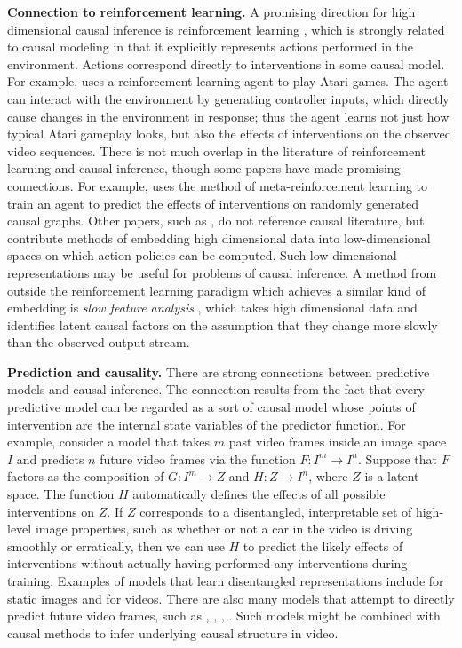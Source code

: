 \documentclass[letterpaper, twocolumn]{article} %
\begin{document}
\noindent \textbf{Connection to reinforcement learning.} A promising direction for high dimensional causal inference is reinforcement learning \cite{sutton2018reinforcement}, which is strongly related to causal modeling in that it explicitly represents actions performed in the environment. Actions correspond directly to interventions in some causal model. For example, \cite{oh2015action} uses a reinforcement learning agent to play Atari games. The agent can interact with the environment by generating controller inputs, which directly cause changes in the environment in response; thus the agent learns not just how typical Atari gameplay looks, but also the effects of interventions on the observed video sequences. There is not much overlap in the literature of reinforcement learning and causal inference, though some papers have made promising connections. For example, \cite{dasgupta2019causal} uses the method of meta-reinforcement learning to train an agent to predict the effects of interventions on randomly generated causal graphs. Other papers, such as \cite{lange2012autonomous}, do not reference causal literature, but contribute methods of embedding high dimensional data into low-dimensional spaces on which action policies can be computed. Such low dimensional representations may be useful for problems of causal inference. A method from outside the reinforcement learning paradigm which achieves a similar kind of embedding is \emph{slow feature analysis} \cite{kompella2011incremental}, which takes high dimensional data and identifies latent causal factors on the assumption that they change more slowly than the observed output stream.

\noindent \textbf{Prediction and causality.} There are strong connections between predictive models and causal inference. The connection results from the fact that every predictive model can be regarded as a sort of causal model whose points of intervention are the internal state variables of the predictor function. For example, consider a model that takes $m$ past video frames inside an image space $I$ and predicts $n$ future video frames via the function $F: I^m \rightarrow I^n$. Suppose that $F$ factors as the composition of $G: I^m \rightarrow Z$ and $H: Z \rightarrow I^n$, where $Z$ is a latent space. The function $H$ automatically defines the effects of all possible interventions on $Z$. If $Z$ corresponds to a disentangled, interpretable set of high-level image properties, such as whether or not a car in the video is driving smoothly or erratically, then we can use $H$ to predict the likely effects of interventions without actually having performed any interventions during training. Examples of models that learn disentangled representations include \cite{chen2016infogan} for static images and \cite{denton2017unsupervised} for videos. There are also many models that attempt to directly predict future video frames, such as \cite{babaeizadeh2017stochastic}, \cite{lotter2016deep}, \cite{finn2016unsupervised}, \cite{walker2014patch}. Such models might be combined with causal methods to infer underlying causal structure in video.
\end{document}
